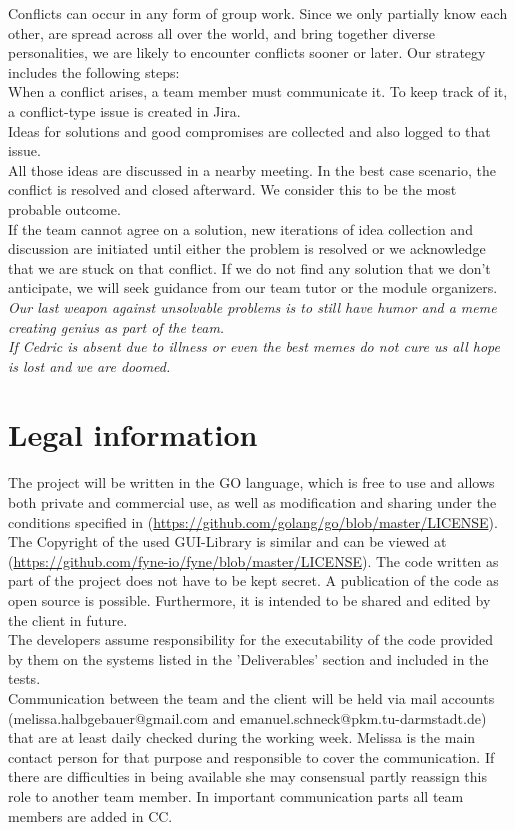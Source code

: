 \documentclass[
	points=true,
 	nenglish,
	colorbacktitle,
	identbarcolor=2b,
	accentcolor=2b
	]{tudaexercise}
\begin{document}
Conflicts can occur in any form of group work. Since we only partially know each other, are spread across all over the world, and bring together diverse personalities, we are likely to encounter conflicts sooner or later.
Our strategy includes the following steps: \\
When a conflict arises, a team member must communicate it. To keep track of it, a conflict-type issue is created in Jira.\\
Ideas for solutions and good compromises are collected and also logged to that issue.\\
All those ideas are discussed in a nearby meeting. In the best case scenario, the conflict is resolved and closed afterward. We consider this to be the most probable outcome.\\
If the team cannot agree on a solution, new iterations of idea collection and discussion are initiated until either the problem is resolved or we acknowledge that we are stuck on that conflict. If we do not find any solution that we don't anticipate, we will seek guidance from our team tutor or the module organizers. \\
\textit{Our last weapon against unsolvable problems is to still have humor and a meme creating genius as part of the team. \\ If Cedric is absent due to illness or even the best memes do not cure us all hope is lost and we are doomed.}

\newpage
\section{Legal information}
The project will be written in the GO language, which is free to use and allows both private and commercial use, as well as modification and sharing under the conditions specified in (\url{https://github.com/golang/go/blob/master/LICENSE}). The Copyright of the used GUI-Library is similar and can be viewed at (\url{https://github.com/fyne-io/fyne/blob/master/LICENSE}). The code written as part of the project does not have to be kept secret. A publication of the code as open source is possible. Furthermore, it is intended to be shared and edited by the client in future. \\
The developers assume responsibility for the executability of the code provided by them on the systems listed in the 'Deliverables' section and included in the tests. \\
Communication between the team and the client will be held via mail accounts (melissa.halbgebauer@gmail.com and emanuel.schneck@pkm.tu-darmstadt.de) that are at least daily checked during the working week. Melissa is the main contact person for that purpose and responsible to cover the communication. If there are difficulties in being available she may consensual partly reassign this role to another team member. In important communication parts all team members are added in CC.
\end{document}

